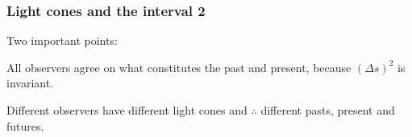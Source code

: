 \documentclass[xcolor=x11names,compress]{beamer}
\renewcommand{\(}{\begin{columns}}
\renewcommand{\)}{\end{columns}}
\newcommand{\<}[1]{\begin{column}{#1}}
\renewcommand{\>}{\end{column}}
\begin{document}
\begin{frame}
\frametitle{Light cones and the interval 2}

Two important points:

\bigskip

\begin{beamerboxesrounded}[upper=uppercol,lower=lowercol,shadow=true]
{All observers agree on what constitutes the past and present, because
$(\Delta s)^2$ is invariant.}
\end{beamerboxesrounded}

\bigskip

\begin{beamerboxesrounded}[upper=uppercol,lower=lowercol,shadow=true]
{Different observers have different light cones and $\therefore$
different pasts, present and futures.}
\end{beamerboxesrounded}

\end{frame}
\end{document}

